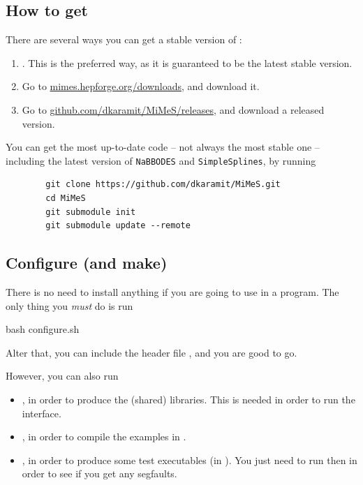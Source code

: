 \documentclass[10pt,utf8,compress,xcolor=dvipsnames]{beamer}
\begin{document}
\subsection{How to get \mimes}
\begin{frame}[fragile]{\insertsubsectionhead}
	There are several ways you can get a stable version of \mimes:
	\begin{enumerate}
		\item {}. This is the preferred way, as it is guaranteed to be the latest stable version.
		\item Go to \href{https://mimes.hepforge.org/downloads}{mimes.hepforge.org/downloads}, and download it. 
		\item Go to \href{https://github.com/dkaramit/MiMeS/releases}{github.com/dkaramit/MiMeS/releases}, and download a released version.    
	\end{enumerate}

	
	You can get the most up-to-date code -- not always the most stable one -- including the latest version of {\tt NaBBODES} and {\tt SimpleSplines}, by running
	\begin{lstlisting}
		git clone https://github.com/dkaramit/MiMeS.git
		cd MiMeS
		git submodule init
		git submodule update --remote
	\end{lstlisting}

\end{frame}

\subsection{Configure (and make)}
\begin{frame}[fragile]{\insertsubsectionhead}
	There is no need to install anything if you are going to use \mimes in a \CPP program. The only thing you {\em must} do is run 
	\begin{bash}
		bash configure.sh
	\end{bash}
	Alter that, you can include the header file , and you are good to go.
	
	However, you can also run 
	\begin{itemize}
		\item {}, in order to produce the (shared) libraries. This is needed in order to run the \PY interface. 
		\item {}, in order to compile the examples in .
		\item {}, in order to produce some test executables  (in ). You just need to run then in order to see if you get any segfaults.
	\end{itemize}
\end{frame}
\end{document}
